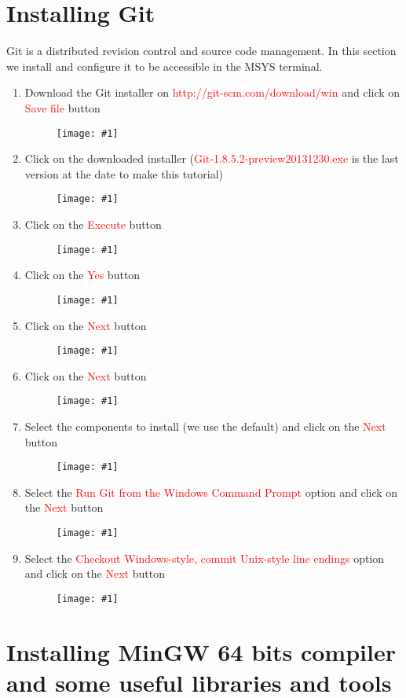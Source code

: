 \documentclass[a4paper]{article}
\newcommand{\FIGURE}[1]
{
	\begin{figure}[!ht]
	\centering
	\texttt{[image: \#1]}
	\end{figure}
}
\newcommand{\RED}[1] {\textcolor{red}{#1}}
\begin{document}
\clearpage

\section{Installing Git}

Git is a distributed revision control and source code management. In this
section we install and configure it to be accessible in the MSYS terminal.

\begin{enumerate}

\item Download the Git installer on \RED{http://git-scm.com/download/win} and
click on \RED{Save file} button
\FIGURE{git-1.png.eps}

\clearpage

\item Click on the downloaded installer (\RED{Git-1.8.5.2-preview20131230.exe}
is the last version at the date to make this tutorial)
\FIGURE{git-2.png.eps}

\item Click on the \RED{Execute} button
\FIGURE{git-3.png.eps}

\clearpage

\item Click on the \RED{Yes} button
\FIGURE{git-4.png.eps}

\item Click on the \RED{Next} button
\FIGURE{git-5.png.eps}

\clearpage

\item Click on the \RED{Next} button
\FIGURE{git-6.png.eps}

\item Select the components to install (we use the default) and click on the
\RED{Next} button
\FIGURE{git-7.png.eps}

\clearpage

\item Select the \RED{Run Git from the Windows Command Prompt} option and click
on the \RED{Next} button
\FIGURE{git-8.png.eps}

\item Select the \RED{Checkout Windows-style, commit Unix-style line endings}
option and click on the \RED{Next} button
\FIGURE{git-9.png.eps}

\clearpage

\end{enumerate}

\section{Installing MinGW 64 bits compiler and some useful libraries and tools}
\end{document}
